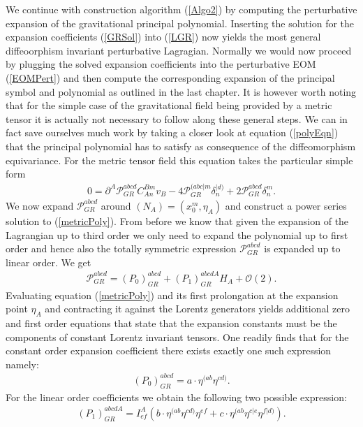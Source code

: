 \documentclass[a4paper,12pt, DIV=14, BCOR=5mm, twoside, headsepline]{scrbook}
\begin{document}
We continue with construction algorithm (\ref{Algo2}) by computing the perturbative expansion of the gravitational principal polynomial. Inserting the solution for the expansion coefficients (\ref{GRSol}) into (\ref{LGR}) now yields the most general diffeoorphism invariant perturbative Lagragian. Normally we would now proceed by plugging the solved expansion coefficients into the perturbative EOM (\ref{EOMPert}) and then compute the corresponding expansion of the principal symbol and polynomial as outlined in the last chapter. It is however worth noting that for the simple case of the gravitational field being provided by a metric tensor it is actually not necessary to follow along these general steps. We can in fact save ourselves much work by taking a closer look at equation (\ref{polyEqn}) that the principal polynomial has to satisfy as consequence of the diffeomorphism equivariance. For the metric tensor field this equation takes the particular simple form
\begin{align}\label{metricPoly}
    0 = \partial^A \mathcal{P}_{GR}^{abcd} C_{An}^{Bm} v_B - 4\mathcal{P}_{GR}^{(abc\vert m} \delta_n^{\vert d)} + 2 \mathcal{P}_{GR}^{abcd} \delta^m_n.
\end{align}
We now expand $\mathcal{P}_{GR}^{abcd}$ around $(N_{A}) = (x_0^m, \eta_A)$ and construct a power series solution to (\ref{metricPoly}). From before we know that given the expansion of the Lagrangian up to third order we only need to expand the polynomial up to first order and hence also the totally symmetric expression $\mathcal{P}_{GR}^{abcd}$ is expanded up to linear order. We get 
\begin{align}
    \mathcal{P}_{GR}^{abcd} = (P_0)_{GR}^{abcd} + (P_1)_{GR}^{abcdA} H_A + \mathcal{O}(2).
\end{align}
Evaluating equation (\ref{metricPoly}) and its first prolongation at the expansion point $\eta_A$ and contracting it against the Lorentz generators yields additional zero and first order equations that state that the expansion constants must be the components of constant Lorentz invariant tensors. One readily finds that for the constant order expansion coefficient there exists exactly one such expression namely:
\begin{align}
   (P_0)_{GR}^{abcd} = a \cdot \eta^{(ab} \eta^{cd)}. 
\end{align}
For the linear order coefficients we obtain the following two possible expression:
\begin{align}
    (P_1)_{GR}^{abcdA} = I^A_{ef} \left (b \cdot \eta^{(ab} \eta^{cd)}  \eta^{ef} + c \cdot \eta^{(ab} \eta^{c \vert e} \eta^{f \vert d)} \right ).
\end{align}
\end{document}
